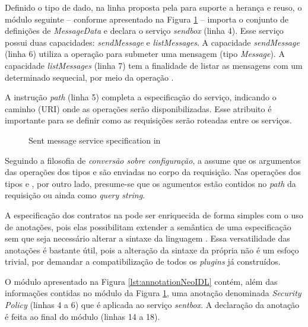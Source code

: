 Definido o tipo de dado, na linha proposta pela \neoidl{} para
suporte a herança e reuso, o módulo seguinte -- conforme apresentado na Figura
\ref{lst:sentmessage-neo} -- importa o conjunto de definições de
\emph{MessageData} e declara o serviço \emph{sendbox} (linha 4). Esse serviço possui duas capacidades:
\emph{sendMessage} e \emph{listMessages}.
A capacidade \emph{sendMessage} (linha 6) utiliza a operação  para
submeter uma mensagem (tipo \emph{Message}). A capacidade \emph{listMessages}
(linha 7) tem a finalidade de listar as mensagens com um determinado sequecial,
por meio da operação .

A instrução \emph{path} (linha 5) completa a especificação do serviço, indicando
o caminho (URI) onde as operações serão disponibilizadas. Esse atribuito é importante para se definir
como as requisições serão roteadas entre os serviços.

\vspace{6mm}

\begin{figure}[htb]
\begin{small}

\end{small}
\caption{Sent message service specification in \neoidl}
\label{lst:sentmessage-neo}
\end{figure}

Seguindo a filosofia de \emph{conversão sobre configuração}, a \neoidl{} assume
que os argumentos das operações dos tipos  e  são
enviadas no corpo da requisição. Nas operações dos tipos  e
, por outro lado, presume-se que os agumentos estão contidos no \emph{path} da requisição ou ainda
como \textit{query string}.

A especificação dos contratos na \neoidl{} pode ser enriquecida de forma simples
com o uso de anotações, pois elas possibilitam extender a semântica
de uma especificação sem que seja necessário alterar a sintaxe da
linguagem \neoidl{}. Essa versatilidade das anotações é bastante útil, pois a
alteração da sintaxe da própria \neoidl{} não é um esfoço trivial, por demandar
a compatibilização de todos os \textit{plugins} já construídos.

O módulo apresentado na Figura \ref{lst:annotationNeoIDL} contém, além das
informações contidas no módulo da Figura \ref{lst:sentmessage-neo}, uma anotação
denominada \emph{Security Policy} (linhas 4 a 6) que é aplicada ao serviço
\emph{sentbox}.
A declaração da anotação é feita ao final do módulo (linhas 14 a 18).

